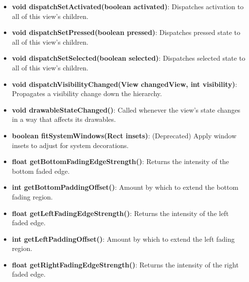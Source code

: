 \documentclass{report}
\begin{document}
\begin{itemize}
\begin{itemize}
                \item \textbf{void dispatchSetActivated(boolean activated)}:  
                    Dispatches activation to all of this view’s children.

                \item \textbf{void dispatchSetPressed(boolean pressed)}:  
                    Dispatches pressed state to all of this view’s children.

                \item \textbf{void dispatchSetSelected(boolean selected)}:  
                    Dispatches selected state to all of this view’s children.

                \item \textbf{void dispatchVisibilityChanged(View changedView, int visibility)}:  
                    Propagates a visibility change down the hierarchy.

                \item \textbf{void drawableStateChanged()}:  
                    Called whenever the view’s state changes in a way that affects its drawables.

                \item \textbf{boolean fitSystemWindows(Rect insets)}:  
                    (Deprecated) Apply window insets to adjust for system decorations.

                \item \textbf{float getBottomFadingEdgeStrength()}:  
                    Returns the intensity of the bottom faded edge.

                \item \textbf{int getBottomPaddingOffset()}:  
                    Amount by which to extend the bottom fading region.

                \item \textbf{float getLeftFadingEdgeStrength()}:  
                    Returns the intensity of the left faded edge.

                \item \textbf{int getLeftPaddingOffset()}:  
                    Amount by which to extend the left fading region.

                \item \textbf{float getRightFadingEdgeStrength()}:  
                    Returns the intensity of the right faded edge.


\end{itemize}
\end{itemize}
\end{document}
